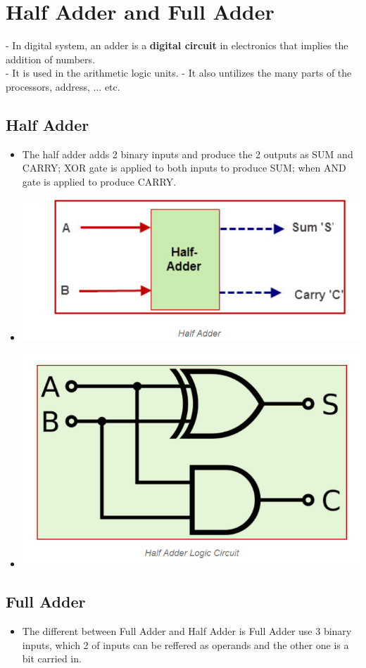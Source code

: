 \documentclass[12pt]{article}
\begin{document}
\section{Half Adder and Full Adder}
- In digital system, an adder is a \textbf{digital circuit} in electronics that implies the addition of numbers. \\
- It is used in the arithmetic logic units.
- It also untilizes the many parts of the processors, address, ... etc. \\
\subsection{Half Adder}
\begin{itemize}
	\item The half adder adds 2 binary inputs and produce the 2 outputs as SUM and CARRY; XOR gate is applied to both inputs to produce SUM; when AND gate is applied to produce CARRY.
	\item \includegraphics[scale = 0.8]{hinh17}
	\item \includegraphics[scale = 0.8]{hinh18}
\end{itemize}
\subsection{Full Adder}
\begin{itemize}
	\item The different between Full Adder and Half Adder is Full Adder use 3 binary inputs, which 2 of inputs can be reffered as operands and the other one is a bit carried in.
\end{itemize} 
\end{document}
